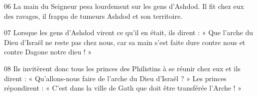 
06 La main du Seigneur pesa lourdement sur les gens d’Ashdod. Il fit chez eux des ravages, il frappa de tumeurs Ashdod et son territoire.

07 Lorsque les gens d’Ashdod virent ce qu’il en était, ils dirent : « Que l’arche du Dieu d’Israël ne reste pas chez nous, car sa main s’est faite dure contre nous et contre Dagone notre dieu ! »

08 Ils invitèrent donc tous les princes des Philistins à se réunir chez eux et ils dirent : « Qu’allons-nous faire de l’arche du Dieu d’Israël ? » Les princes répondirent : « C’est dans la ville de Gath que doit être transférée l’Arche ! » 